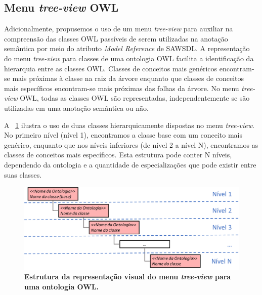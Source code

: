 \subsection{Menu \textit{tree-view} OWL}\label{4-menu-owl}

Adicionalmente, propusemos o uso de um menu \textit{tree-view} para auxiliar na compreensão das classes OWL passíveis de serem utilizadas na anotação semântica por meio do atributo \textit{Model Reference} de SAWSDL. A representação do menu \textit{tree-view} para classes de uma ontologia OWL facilita a identificação da hierarquia entre as classes OWL. Classes de conceitos mais genéricos encontram-se mais próximas à classe na raiz da árvore enquanto que classes de conceitos mais específicos encontram-se mais próximas das folhas da árvore. No menu \textit{tree-view} OWL, todas as classes OWL são representadas, independentemente se são utilizadas em uma anotação semântica ou não.

A \figurename~\ref{fig:menu-tree-view-owl} ilustra o uso de duas classes hierarquicamente dispostas no menu \textit{tree-view}. No primeiro nível (nível 1), encontramos a classe base com um conceito mais genérico, enquanto que nos níveis inferiores (de nível 2 a nível N), encontramos as classes de conceitos mais específicos. Esta estrutura pode conter N níveis, dependendo da ontologia e a quantidade de especializações que pode existir entre suas classes.

\begin{figure}[h]
    \includegraphics[scale=0.3]{4-grasews/imagens/menu-tree-view-owl.png}
    \centering
    \caption[Estrutura da representação visual do menu \textit{tree-view} para uma ontologia OWL]{\textbf{Estrutura da representação visual do menu \textit{tree-view} para uma ontologia OWL.}}
    \label{fig:menu-tree-view-owl}
\end{figure}

